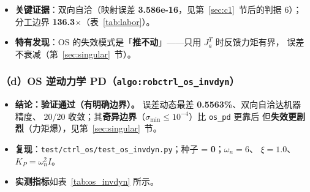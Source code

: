 \documentclass[11pt,a4paper]{ctexart}
\begin{document}
\begin{table}[H]
\centering
\small
\caption{\texttt{os\_pd} 在 2R 与 6R 上的实测指标（6R 分 3a 子集与边界样本）}\label{tab:os_pd}
\end{table}

\begin{itemize}[leftmargin=1.6em,itemsep=2pt]
\item \textbf{关键证据}：双向自洽（映射误差 \textbf{3.586e-16}，见第~\ref{sec:c1}~节后的判据 6）；
  分工边界 \textbf{136.3$\times$}（表~\ref{tab:labor}）。
\item \textbf{特有发现}：OS 的失效模式是「\textbf{推不动}」——只用 $J_a^{T}$ 时反馈力矩有界，
  误差不衰减（第~\ref{sec:singular}~节）。
\end{itemize}

\subsubsection{（d）OS 逆动力学 PD（\texttt{algo:robctrl\_os\_invdyn}）}

\begin{itemize}[leftmargin=1.6em,itemsep=3pt]
\item \textbf{结论：验证通过（有明确边界）。} 误差动态最差 \textbf{0.5563\%}、双向自洽达机器精度、
  20/20 收敛；其\textbf{奇异边界}（$\sigma_{\min}\le10^{-4}$）比 \texttt{os\_pd} 更靠后
  但\textbf{失效更剧烈}（力矩爆），见第~\ref{sec:singular}~节。
\item \textbf{复现}：\texttt{test/ctrl\_os/test\_os\_invdyn.py}；种子 = \textbf{0}；$\omega_n=6$、
  $\xi=1.0$、$K_P=\omega_n^2I$。
\item \textbf{实测指标}如表~\ref{tab:os_invdyn} 所示。
\end{itemize}
\end{document}
